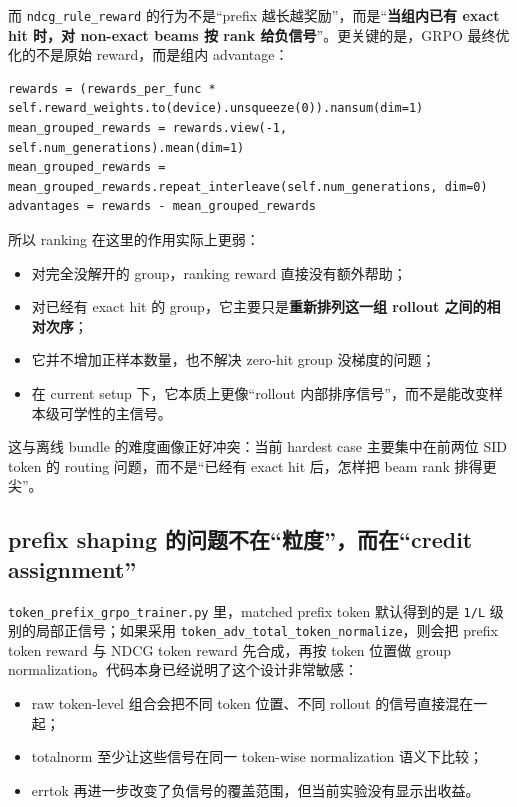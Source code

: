 \documentclass[a4paper]{article}
\begin{document}
而 \texttt{ndcg\_rule\_reward} 的行为不是“prefix 越长越奖励”，而是“\textbf{当组内已有 exact hit 时，对 non-exact beams 按 rank 给负信号}”。更关键的是，GRPO 最终优化的不是原始 reward，而是组内 advantage：

\begin{lstlisting}[caption={当前 dynamic/fixed trainer 与普通 GRPO 一样，最终用组内 centered advantage},label={lst:advantage}]
rewards = (rewards_per_func * self.reward_weights.to(device).unsqueeze(0)).nansum(dim=1)
mean_grouped_rewards = rewards.view(-1, self.num_generations).mean(dim=1)
mean_grouped_rewards = mean_grouped_rewards.repeat_interleave(self.num_generations, dim=0)
advantages = rewards - mean_grouped_rewards
\end{lstlisting}

所以 ranking 在这里的作用实际上更弱：
\begin{itemize}
\item 对完全没解开的 group，ranking reward 直接没有额外帮助；
\item 对已经有 exact hit 的 group，它主要只是\textbf{重新排列这一组 rollout 之间的相对次序}；
\item 它并不增加正样本数量，也不解决 zero-hit group 没梯度的问题；
\item 在 current setup 下，它本质上更像“rollout 内部排序信号”，而不是能改变样本级可学性的主信号。
\end{itemize}

这与离线 bundle 的难度画像正好冲突：当前 hardest case 主要集中在前两位 SID token 的 routing 问题，而不是“已经有 exact hit 后，怎样把 beam rank 排得更尖”。

\subsection{prefix shaping 的问题不在“粒度”，而在“credit assignment”}

\texttt{token\_prefix\_grpo\_trainer.py} 里，matched prefix token 默认得到的是 \texttt{1/L} 级别的局部正信号；如果采用 \texttt{token\_adv\_total\_token\_normalize}，则会把 prefix token reward 与 NDCG token reward 先合成，再按 token 位置做 group normalization。代码本身已经说明了这个设计非常敏感：
\begin{itemize}
\item raw token-level 组合会把不同 token 位置、不同 rollout 的信号直接混在一起；
\item totalnorm 至少让这些信号在同一 token-wise normalization 语义下比较；
\item errtok 再进一步改变了负信号的覆盖范围，但当前实验没有显示出收益。
\end{itemize}
\end{document}
